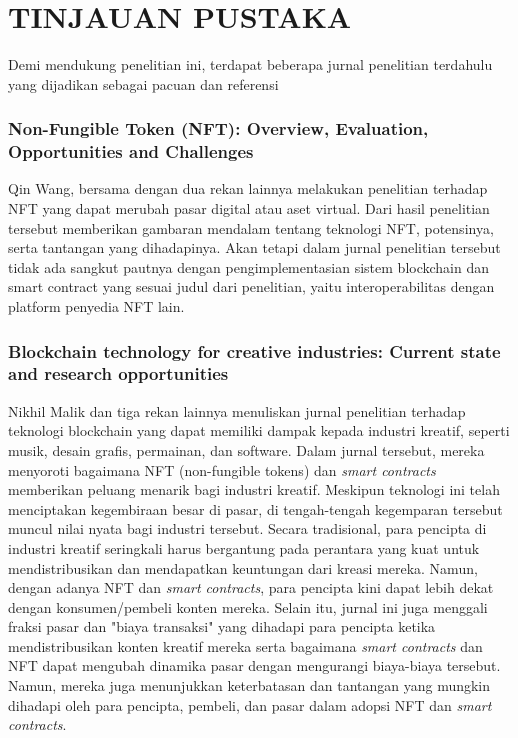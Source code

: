 \chapter{TINJAUAN PUSTAKA}
\label{chap:tinjauanpustaka}


Demi mendukung penelitian ini, terdapat beberapa jurnal penelitian terdahulu yang dijadikan sebagai pacuan dan referensi

\subsection{Non-Fungible Token (NFT): Overview, Evaluation, Opportunities and Challenges}
Qin Wang, bersama dengan dua rekan lainnya melakukan penelitian terhadap NFT yang dapat merubah pasar digital atau aset virtual. Dari hasil penelitian tersebut memberikan gambaran mendalam tentang teknologi NFT, potensinya, serta tantangan yang dihadapinya. Akan tetapi dalam jurnal penelitian tersebut tidak ada sangkut pautnya dengan pengimplementasian sistem blockchain dan smart contract yang sesuai judul dari penelitian, yaitu interoperabilitas dengan platform penyedia NFT lain.

\subsection{Blockchain technology for creative industries: Current state and research opportunities}
Nikhil Malik dan tiga rekan lainnya menuliskan jurnal penelitian terhadap teknologi blockchain yang dapat memiliki dampak kepada industri kreatif, seperti musik, desain grafis, permainan, dan software. Dalam jurnal tersebut, mereka menyoroti bagaimana NFT (non-fungible tokens) dan \emph{smart contracts} memberikan peluang menarik bagi industri kreatif. Meskipun teknologi ini telah menciptakan kegembiraan besar di pasar, di tengah-tengah kegemparan tersebut muncul nilai nyata bagi industri tersebut. Secara tradisional, para pencipta di industri kreatif seringkali harus bergantung pada perantara yang kuat untuk mendistribusikan dan mendapatkan keuntungan dari kreasi mereka. Namun, dengan adanya NFT dan \emph{smart contracts}, para pencipta kini dapat lebih dekat dengan konsumen/pembeli konten mereka. Selain itu, jurnal ini juga menggali fraksi pasar dan "biaya transaksi" yang dihadapi para pencipta ketika mendistribusikan konten kreatif mereka serta bagaimana \emph{smart contracts} dan NFT dapat mengubah dinamika pasar dengan mengurangi biaya-biaya tersebut. Namun, mereka juga menunjukkan keterbatasan dan tantangan yang mungkin dihadapi oleh para pencipta, pembeli, dan pasar dalam adopsi NFT dan \emph{smart contracts}.

